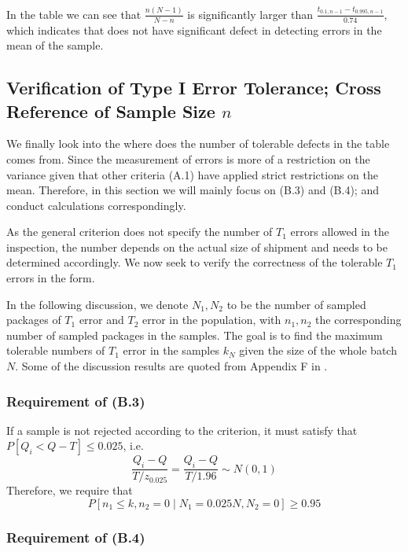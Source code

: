 \documentclass[12pt]{article}
\begin{document}
In the table we can see that $\frac{n(N-1)}{N-n}$ is significantly larger than $\frac{t_{0.1,n-1} - t_{0.995,n-1}}{0.74}$, which indicates that \cite{JJF2005} does not have significant defect in detecting errors in the mean of the sample.

\subsection{Verification of Type I Error Tolerance; Cross Reference of Sample Size $n$}
\label{typeierror}

We finally look into the where does the number of tolerable defects in the table comes from. Since the measurement of errors is more of a restriction on the variance given that other criteria (A.1) have applied strict restrictions on the mean. Therefore, in this section we will mainly focus on (B.3) and (B.4); and conduct calculations correspondingly.

As the general criterion does not specify the number of $T_1$ errors allowed in the inspection, the number depends on the actual size of shipment and needs to be determined accordingly. We now seek to verify the correctness of the tolerable $T_1$ errors in the form. 

In the following discussion, we denote $N_1, N_2$ to be the number of sampled packages of $T_1$ error and $T_2$ error in the population, with $n_1, n_2$ the corresponding number of sampled packages in the samples. The goal is to find the maximum tolerable numbers of $T_1$ error in the samples $k_{N}$ given the size of the whole batch $N$. Some of the discussion results are quoted from Appendix F in \cite{OIML2016}.

\subsubsection{Requirement of (B.3)}

If a sample is not rejected according to the criterion, it must satisfy that $P[Q_i < Q - T] \leq 0.025$, i.e. 
$$
\dfrac{Q_i - Q}{T/z_{0.025}} = \dfrac{Q_i - Q}{T/1.96}\sim N(0,1)
$$
Therefore, we require that
\begin{equation}\label{b3}
    P[n_1\leq k, n_2 = 0\mid N_1 = 0.025N, N_2 = 0] \geq 0.95
\end{equation}

\subsubsection{Requirement of (B.4)}
\end{document}

